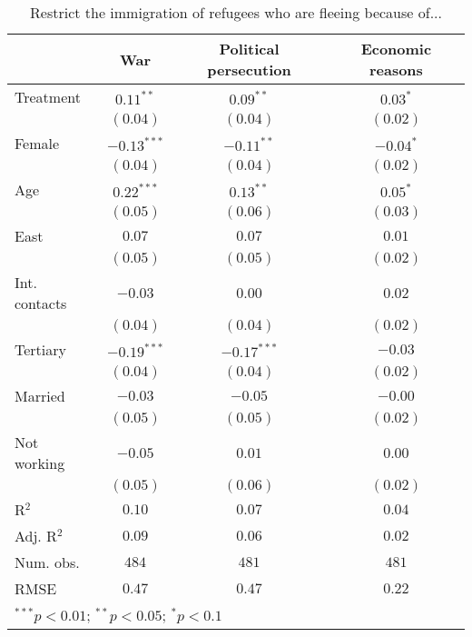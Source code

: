 
\begin{table}
\caption{Restrict the immigration of refugees who are fleeing because of...}
\begin{center}
\begin{tabular}{l c c c}
\toprule
 & War & Political persecution & Economic reasons \\
\midrule
Treatment     & $0.11^{**}$   & $0.09^{**}$   & $0.03^{*}$  \\
              & $(0.04)$      & $(0.04)$      & $(0.02)$    \\
Female        & $-0.13^{***}$ & $-0.11^{**}$  & $-0.04^{*}$ \\
              & $(0.04)$      & $(0.04)$      & $(0.02)$    \\
Age           & $0.22^{***}$  & $0.13^{**}$   & $0.05^{*}$  \\
              & $(0.05)$      & $(0.06)$      & $(0.03)$    \\
East          & $0.07$        & $0.07$        & $0.01$      \\
              & $(0.05)$      & $(0.05)$      & $(0.02)$    \\
Int. contacts & $-0.03$       & $0.00$        & $0.02$      \\
              & $(0.04)$      & $(0.04)$      & $(0.02)$    \\
Tertiary      & $-0.19^{***}$ & $-0.17^{***}$ & $-0.03$     \\
              & $(0.04)$      & $(0.04)$      & $(0.02)$    \\
Married       & $-0.03$       & $-0.05$       & $-0.00$     \\
              & $(0.05)$      & $(0.05)$      & $(0.02)$    \\
Not working   & $-0.05$       & $0.01$        & $0.00$      \\
              & $(0.05)$      & $(0.06)$      & $(0.02)$    \\
\midrule
R$^2$         & $0.10$        & $0.07$        & $0.04$      \\
Adj. R$^2$    & $0.09$        & $0.06$        & $0.02$      \\
Num. obs.     & $484$         & $481$         & $481$       \\
RMSE          & $0.47$        & $0.47$        & $0.22$      \\
\bottomrule
\multicolumn{4}{l}{\scriptsize{$^{***}p<0.01$; $^{**}p<0.05$; $^{*}p<0.1$}}
\end{tabular}
\label{tab_immi}
\end{center}
\end{table}
